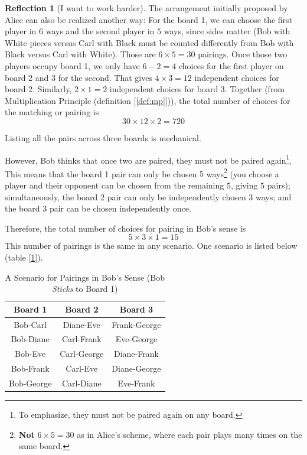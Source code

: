 \documentclass[11pt]{book}
\theoremstyle{definition}
\theoremstyle{plain}
\theoremstyle{definition}
\theoremstyle{problemstyle}
\theoremstyle{remark}
\theoremstyle{definition}
\newtheorem{reflection}{Reflection}
\begin{document}
\begin{reflection}[I want to work harder]
    The arrangement initially proposed by Alice can also be realized another way: For the board 1, we can choose the first player in $6$ ways and the second player in $5$ ways, since sides matter (Bob with White pieces versus Carl with Black must be counted differently from Bob with Black versus Carl with White). Those are $6\times 5=30$ pairings. Once those two players occupy board 1, we only have $6-2=4$ choices for the first player on board 2 and $3$ for the second. That gives $4\times 3=12$ independent choices for board 2. Similarly, $2\times 1=2$ independent choices for board 3. Together (from Multiplication Principle (definition [\ref{def:mp}])), the total number of choices for the matching or pairing is
    \[
        30\times 12\times 2=720
    \]

    Listing all the pairs across three boards is mechanical.

    However, Bob thinks that once two are paired, they must not be paired again\footnote{To emphasize, they must not be paired again on any board.}. This means that the board 1 pair can only be chosen $5$ ways\footnote{\textbf{Not} $6\times 5=30$ as in Alice's scheme, where each pair plays many times on the same board.} (you choose a player and their opponent can be chosen from the remaining $5$, giving $5$ pairs); simultaneously, the board 2 pair can only be independently chosen $3$ ways; and the board 3 pair can be chosen independently once.

    Therefore, the total number of choices for pairing in Bob's sense is
    \[
        5\times 3\times 1=15
    \]
    This number of pairings is the same in any scenario. One scenario is listed below (table [\ref{tab:bob-sense-bob-b1}]).
\begin{table}[H] 
\centering
\begin{tabular}{|c|c|c|}
 \hline
 Board 1&Board 2&Board 3\\ \hline
 \hline
    Bob-Carl&Diane-Eve&Frank-George\\ \hline
    Bob-Diane&Carl-Frank&Eve-George\\ \hline
    Bob-Eve&Carl-George&Diane-Frank\\ \hline
    Bob-Frank&Carl-Eve&Diane-George\\ \hline
    Bob-George&Carl-Diane&Eve-Frank\\ \hline
\end{tabular}

\label{tab:bob-sense-bob-b1}
    \caption{A Scenario for Pairings in Bob's Sense (Bob \emph{Sticks} to Board 1)}
\end{table}


\end{reflection}
\end{document}
